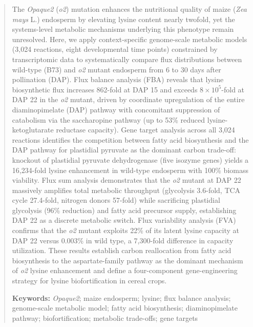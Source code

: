\documentclass[12pt,a4paper]{article}
\begin{document}
\begin{abstract}

The \textit{Opaque2} (\textit{o2}) mutation enhances the nutritional quality of maize (\textit{Zea mays} L.) endosperm by elevating lysine content nearly twofold, yet the systems-level metabolic mechanisms underlying this phenotype remain unresolved. Here, we apply context-specific genome-scale metabolic models (3,024 reactions, eight developmental time points) constrained by transcriptomic data to systematically compare flux distributions between wild-type (B73) and \textit{o2} mutant endosperm from 6 to 30 days after pollination (DAP). Flux balance analysis (FBA) reveals that lysine biosynthetic flux increases 862-fold at DAP 15 and exceeds $8 \times 10^{5}$-fold at DAP 22 in the \textit{o2} mutant, driven by coordinate upregulation of the entire diaminopimelate (DAP) pathway with concomitant suppression of catabolism via the saccharopine pathway (up to 53\% reduced lysine-ketoglutarate reductase capacity). Gene target analysis across all 3,024 reactions identifies the competition between fatty acid biosynthesis and the DAP pathway for plastidial pyruvate as the dominant carbon trade-off: knockout of plastidial pyruvate dehydrogenase (five isozyme genes) yields a 16,234-fold lysine enhancement in wild-type endosperm with 100\% biomass viability. Flux sum analysis demonstrates that the \textit{o2} mutant at DAP 22 massively amplifies total metabolic throughput (glycolysis 3.6-fold, TCA cycle 27.4-fold, nitrogen donors 57-fold) while sacrificing plastidial glycolysis (96\% reduction) and fatty acid precursor supply, establishing DAP 22 as a discrete metabolic switch. Flux variability analysis (FVA) confirms that the \textit{o2} mutant exploits 22\% of its latent lysine capacity at DAP 22 versus 0.003\% in wild type, a 7,300-fold difference in capacity utilization. These results establish carbon reallocation from fatty acid biosynthesis to the aspartate-family pathway as the dominant mechanism of \textit{o2} lysine enhancement and define a four-component gene-engineering strategy for lysine biofortification in cereal crops.

\vspace{6pt}
\noindent\textbf{Keywords:} \textit{Opaque2}; maize endosperm; lysine; flux balance analysis; genome-scale metabolic model; fatty acid biosynthesis; diaminopimelate pathway; biofortification; metabolic trade-offs; gene targets

\end{abstract}
\end{document}
